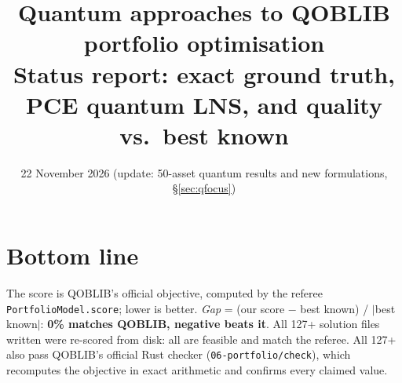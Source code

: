 \documentclass[11pt]{article}
\title{\textbf{Quantum approaches to QOBLIB portfolio optimisation}\\[2pt]
\large Status report: exact ground truth, PCE quantum LNS, and quality vs.\ best known}
\date{22 November 2026 (update: 50-asset quantum results and new formulations, \S\ref{sec:qfocus})}
\author{}
\begin{document}
\sloppy
\maketitle
\vspace{-1cm}

\section*{Bottom line}
The score is QOBLIB's official objective, computed by the referee \texttt{PortfolioModel.score}; lower
is better. \emph{Gap} = (our score $-$ best known) / $|$best known$|$: \textbf{0\% matches QOBLIB,
negative beats it}. All 127+ solution files written were re-scored from disk: all are feasible and
match the referee. All 127+ also pass QOBLIB's official Rust checker (\texttt{06-portfolio/check}),
which recomputes the objective in exact arithmetic and confirms every claimed value.
\end{document}
